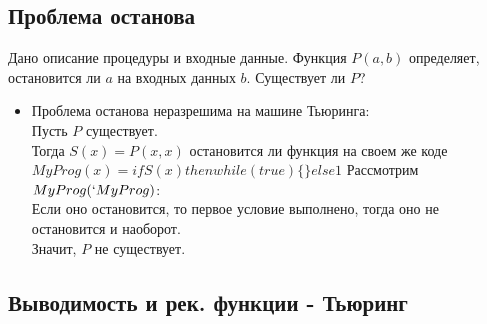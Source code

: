 \subsection{Проблема останова}
\label{sec-12-4}
Дано описание процедуры и входные данные. Функция $P(a, b)$ определяет, остановится ли $a$ на входных данных $b$. Существует ли $P$?
\begin{itemize}
\item Проблема останова неразрешима на машине Тьюринга:\\
Пусть $P$ существует.\\
Тогда $S(x) = P(x, x)$ остановится ли функция на своем же коде\\
$MyProg(x) = if S(x) then while(true)\{\} else 1$ 
Рассмотрим $MyProg(`MyProg)$:\\
Если оно остановится, то первое условие выполнено, тогда оно не остановится и наоборот.\\
Значит, $P$ не существует.
\end{itemize}
\subsection{Выводимость и рек. функции - Тьюринг}
\label{sec-12-5}
